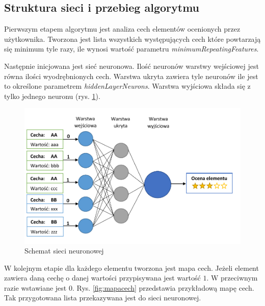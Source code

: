 \documentclass[twoside]{iisthesis}
\begin{document}
	 \subsection{Struktura sieci i przebieg algorytmu}
	 \label{ss:strukturasiecineuronowej}		 
		 Pierwszym etapem algorytmu jest analiza cech elementów ocenionych przez użytkownika. Tworzona jest lista wszystkich występujących cech które powtarzają się minimum tyle razy, ile wynosi wartość  parametru \textit{minimumRepeatingFeatures}. 
		 
		 Następnie inicjowana jest sieć neuronowa. Ilość neuronów warstwy wejściowej jest równa ilości wyodrębnionych cech. Warstwa ukryta zawiera tyle neuronów ile jest to określone parametrem \textit{hiddenLayerNeurons}. Warstwa wyjściowa składa się z tylko jednego neuronu (rys. \ref{fig:siecneuronowa}). 
		 
		 \begin{figure}%
		 	\centering
		 	\includegraphics[width=1\textwidth]{siecneuronowa}
		 	\caption{Schemat sieci neuronowej}
		 	\label{fig:siecneuronowa}
		 \end{figure}
		 
		 W kolejnym etapie dla każdego elementu tworzona jest mapa cech. Jeżeli element zawiera daną cechę o danej wartości przypisywana jest wartość $1$. W przeciwnym razie wstawiane jest $0$. Rys. \ref{fig:mapacech} przedstawia przykładową mapę cech. Tak przygotowana lista przekazywana jest do sieci neuronowej. 
		 
\end{document}
